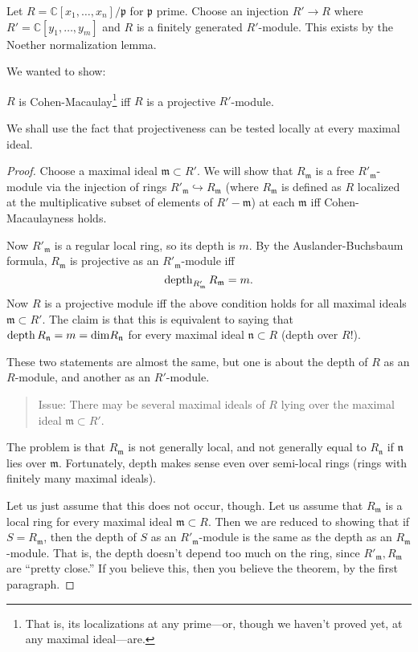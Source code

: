 \begin{example}
Let $R = \mathbb{C}[x_1, \dots, x_n]/\mathfrak{p}$ for
$\mathfrak{p}$ prime.
Choose an injection $R' \to R$ where $R' = \mathbb{C}[y_1,
\dots, y_m]$ and
$R$ is a finitely generated $R'$-module. This exists by the Noether
normalization lemma.

We wanted to show:

\begin{theorem}
$R$ is Cohen-Macaulay\footnote{That is, its localizations at any
prime---or,
though we haven't proved yet, at any maximal ideal---are.} iff
$R$ is a
projective $R'$-module.
\end{theorem}

We shall use the fact that projectiveness can be tested locally
at every
maximal ideal.

\begin{proof}
Choose a maximal ideal $\mathfrak{m} \subset R'$. We will show
that
$R_{\mathfrak{m}}$ is a free $R'_{\mathfrak{m}}$-module via the
injection of
rings $R'_{\mathfrak{m}} \hookrightarrow R_{\mathfrak{m}}$
(where
$R_{\mathfrak{m}}$ is defined as $R$ localized at the
multiplicative subset
of elements of $R' - \mathfrak{m}$) at each $\mathfrak{m}$ iff
Cohen-Macaulayness holds.

Now $R'_{\mathfrak{m}}$ is a regular local ring, so its depth is
$m$. By the
Auslander-Buchsbaum formula, $R_{\mathfrak{m}}$ is projective as
an
$R'_{\mathfrak{m}}$-module iff
\[ \operatorname{depth}_{R'_{\mathfrak{m}}} R_{\mathfrak{m}} = m.  \]
Now $R$ is a projective module iff the above condition holds for
all maximal
ideals $\mathfrak{m} \subset R'$. The claim is that this is
equivalent to
saying that $\operatorname{depth} R_{\mathfrak{n}} = m = \mathrm{dim}
R_{\mathfrak{n}}$
for every maximal ideal $\mathfrak{n} \subset R$ (depth over
$R$!).

These two statements are almost the same, but one is about the
depth of $R$ as
an $R$-module, and another as an $R'$-module.

\begin{quote}
Issue: There may be several maximal ideals of $R$ lying over the
maximal ideal
$\mathfrak{m} \subset R'$.
\end{quote}

The problem is that $R_{\mathfrak{m}}$ is not generally local,
and not
generally equal to $R_{\mathfrak{n}}$ if $\mathfrak{n}$ lies
over
$\mathfrak{m}$. Fortunately, depth makes sense even over
semi-local rings
(rings with finitely many maximal ideals).

Let us just assume that this does not occur, though. Let us
assume that
$R_{\mathfrak{m}}$ is a local ring for every maximal ideal
$\mathfrak{m}
\subset R$. Then we are reduced to showing that if $S =
R_{\mathfrak{m}}$,
then the depth of $S$ as an $R'_{\mathfrak{m}}$-module is the
same as the
depth as an $R_{\mathfrak{m}}$-module. That is, the depth
doesn't depend too
much on the ring, since $R'_{\mathfrak{m}}, R_{\mathfrak{m}}$
are ``pretty
close.'' If you believe this, then you believe the theorem, by
the first
paragraph.



\end{proof}
\end{example}
